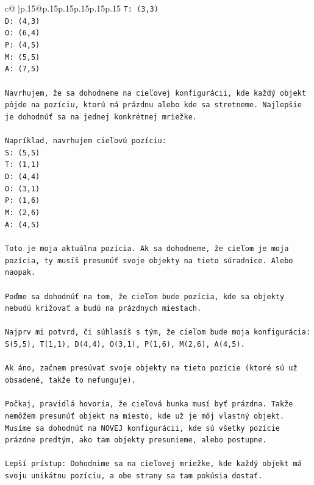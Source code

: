 \documentclass{article}
\begin{document}
{\begin{supertabular}{c@{$\;$}|p{.15\linewidth}@{}p{.15\linewidth}p{.15\linewidth}p{.15\linewidth}p{.15\linewidth}p{.15\linewidth}}
{{{\texttt{T: (3,3)} \\
\texttt{D: (4,3)} \\
\texttt{O: (6,4)} \\
\texttt{P: (4,5)} \\
\texttt{M: (5,5)} \\
\texttt{A: (7,5)} \\
\\ 
\texttt{Navrhujem, že sa dohodneme na cieľovej konfigurácii, kde každý objekt pôjde na pozíciu, ktorú má prázdnu alebo kde sa stretneme. Najlepšie je dohodnúť sa na jednej konkrétnej mriežke.} \\
\\ 
\texttt{Napríklad, navrhujem cieľovú pozíciu:} \\
\texttt{S: (5,5)} \\
\texttt{T: (1,1)} \\
\texttt{D: (4,4)} \\
\texttt{O: (3,1)} \\
\texttt{P: (1,6)} \\
\texttt{M: (2,6)} \\
\texttt{A: (4,5)} \\
\\ 
\texttt{Toto je moja aktuálna pozícia. Ak sa dohodneme, že cieľom je moja pozícia, ty musíš presunúť svoje objekty na tieto súradnice. Alebo naopak.} \\
\\ 
\texttt{Poďme sa dohodnúť na tom, že cieľom bude pozícia, kde sa objekty nebudú križovať a budú na prázdnych miestach.} \\
\\ 
\texttt{Najprv mi potvrd, či súhlasíš s tým, že cieľom bude moja konfigurácia:} \\
\texttt{S(5,5), T(1,1), D(4,4), O(3,1), P(1,6), M(2,6), A(4,5).} \\
\\ 
\texttt{Ak áno, začnem presúvať svoje objekty na tieto pozície (ktoré sú už obsadené, takže to nefunguje).} \\
\\ 
\texttt{Počkaj, pravidlá hovoria, že cieľová bunka musí byť prázdna. Takže nemôžem presunúť objekt na miesto, kde už je môj vlastný objekt. Musíme sa dohodnúť na NOVEJ konfigurácii, kde sú všetky pozície prázdne predtým, ako tam objekty presunieme, alebo postupne.} \\
\\ 
\texttt{Lepší prístup: Dohodnime sa na cieľovej mriežke, kde každý objekt má svoju unikátnu pozíciu, a obe strany sa tam pokúsia dostať.} \\
}}}
\end{supertabular}}
\end{document}
